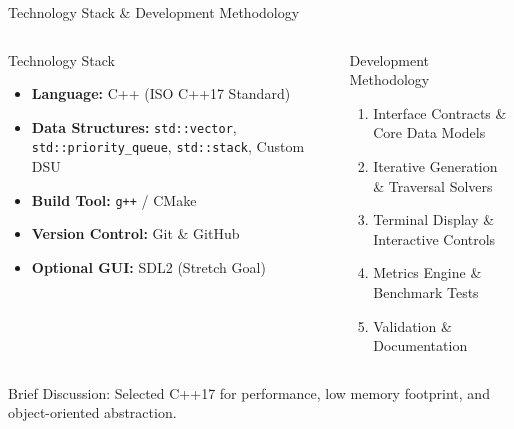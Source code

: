 \documentclass[aspectratio=169,11pt]{beamer}
\newcommand{\smallnote}[1]{%
\vspace{0.08cm}
{\scriptsize\color{GEUGrey}#1}
}
\begin{document}
\begin{frame}{Technology Stack \& Development Methodology}

\begin{columns}[T,totalwidth=\textwidth]


\begin{block}{Technology Stack}

\begin{itemize}\itemsep2pt
\item \textbf{Language:} C++ (ISO C++17 Standard)
\item \textbf{Data Structures:} \texttt{std::vector}, \texttt{std::priority\_queue}, \texttt{std::stack}, Custom DSU
\item \textbf{Build Tool:} \texttt{g++} / CMake
\item \textbf{Version Control:} Git \& GitHub
\item \textbf{Optional GUI:} SDL2 (Stretch Goal)
\end{itemize}

\end{block}


\begin{block}{Development Methodology}

\begin{enumerate}\itemsep2pt
\item Interface Contracts \& Core Data Models
\item Iterative Generation \& Traversal Solvers
\item Terminal Display \& Interactive Controls
\item Metrics Engine \& Benchmark Tests
\item Validation \& Documentation
\end{enumerate}

\end{block}

\end{columns}

\vfill

\smallnote{
Brief Discussion: Selected C++17 for performance, low memory footprint, and object-oriented abstraction.
}

\end{frame}
\end{document}
